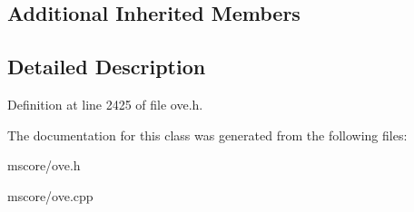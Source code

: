 \subsection*{Additional Inherited Members}


\subsection{Detailed Description}


Definition at line 2425 of file ove.\+h.



The documentation for this class was generated from the following files\+:\begin{DoxyCompactItemize}
\item 
mscore/ove.\+h\item 
mscore/ove.\+cpp\end{DoxyCompactItemize}
